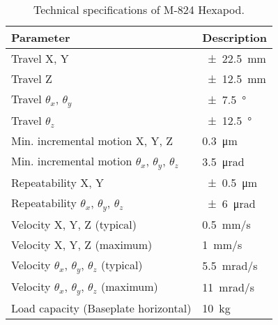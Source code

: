 \begin{table}[h]
    \centering
    \footnotesize
    \renewcommand{\arraystretch}{1.2}
    \begin{tabular}{p{7cm}p{3cm}}
        \toprule
        \textbf{Parameter} & \textbf{Description} \\
        \midrule
        Travel X, Y & \SI{\pm22.5}{\milli\meter} \\        
        Travel Z & \SI{\pm12.5}{\milli\meter} \\        
        Travel $\theta_x$, $\theta_y$ & \SI{\pm7.5}{\degree} \\        
        Travel $\theta_z$ & \SI{\pm12.5}{\degree} \\        
        Min. incremental motion X, Y, Z & \SI{0.3}{\micro\meter} \\
        Min. incremental motion $\theta_x$, $\theta_y$, $\theta_z$ & \SI{3.5}{\micro\radian} \\
        Repeatability X, Y & \SI{\pm0.5}{\micro\meter} \\
        Repeatability $\theta_x$, $\theta_y$, $\theta_z$ & \SI{\pm6}{\micro\radian} \\
        Velocity X, Y, Z (typical) & \SI{0.5}{\milli\meter/\second} \\
        Velocity X, Y, Z (maximum) & \SI{1}{\milli\meter/\second} \\
        Velocity $\theta_x$, $\theta_y$, $\theta_z$ (typical) & \SI{5.5}{\milli\radian/\second} \\
        Velocity $\theta_x$, $\theta_y$, $\theta_z$ (maximum) & \SI{11}{\milli\radian/\second} \\
        Load capacity (Baseplate horizontal) & \SI{10}{\kilo\gram} \\
        \bottomrule
    \end{tabular}
    \caption{Technical specifications of M-824 Hexapod. \cite{hexapod_manual}}
    \label{table:technical_specifications_hexapod}
\end{table}

